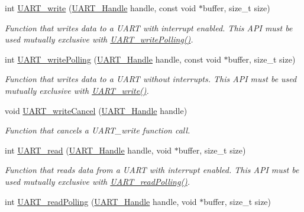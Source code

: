 \begin{DoxyCompactItemize}
int \hyperlink{_u_a_r_t_8h_a6f2a04c09dc17886e69e361cd80aaedc}{U\+A\+R\+T\+\_\+write} (\hyperlink{_u_a_r_t_8h_a13cc669fae768d8212e6491ce71b28af}{U\+A\+R\+T\+\_\+\+Handle} handle, const void $\ast$buffer, size\+\_\+t size)
\begin{DoxyCompactList}\small\item\em Function that writes data to a U\+A\+R\+T with interrupt enabled. This A\+P\+I must be used mutually exclusive with \hyperlink{_u_a_r_t_8h_aed09b432b5ebb7d88e78ccfe338e1bd4}{U\+A\+R\+T\+\_\+write\+Polling()}. \end{DoxyCompactList}\item 
int \hyperlink{_u_a_r_t_8h_aed09b432b5ebb7d88e78ccfe338e1bd4}{U\+A\+R\+T\+\_\+write\+Polling} (\hyperlink{_u_a_r_t_8h_a13cc669fae768d8212e6491ce71b28af}{U\+A\+R\+T\+\_\+\+Handle} handle, const void $\ast$buffer, size\+\_\+t size)
\begin{DoxyCompactList}\small\item\em Function that writes data to a U\+A\+R\+T without interrupts. This A\+P\+I must be used mutually exclusive with \hyperlink{_u_a_r_t_8h_a6f2a04c09dc17886e69e361cd80aaedc}{U\+A\+R\+T\+\_\+write()}. \end{DoxyCompactList}\item 
void \hyperlink{_u_a_r_t_8h_a0482cd0ab9ee7e802c8e785a5754d16d}{U\+A\+R\+T\+\_\+write\+Cancel} (\hyperlink{_u_a_r_t_8h_a13cc669fae768d8212e6491ce71b28af}{U\+A\+R\+T\+\_\+\+Handle} handle)
\begin{DoxyCompactList}\small\item\em Function that cancels a U\+A\+R\+T\+\_\+write function call. \end{DoxyCompactList}\item 
int \hyperlink{_u_a_r_t_8h_a023152d57539cad94bdd813956013e73}{U\+A\+R\+T\+\_\+read} (\hyperlink{_u_a_r_t_8h_a13cc669fae768d8212e6491ce71b28af}{U\+A\+R\+T\+\_\+\+Handle} handle, void $\ast$buffer, size\+\_\+t size)
\begin{DoxyCompactList}\small\item\em Function that reads data from a U\+A\+R\+T with interrupt enabled. This A\+P\+I must be used mutually exclusive with \hyperlink{_u_a_r_t_8h_aee4c56b20ea1c4c33406d99369db3df1}{U\+A\+R\+T\+\_\+read\+Polling()}. \end{DoxyCompactList}\item 
int \hyperlink{_u_a_r_t_8h_aee4c56b20ea1c4c33406d99369db3df1}{U\+A\+R\+T\+\_\+read\+Polling} (\hyperlink{_u_a_r_t_8h_a13cc669fae768d8212e6491ce71b28af}{U\+A\+R\+T\+\_\+\+Handle} handle, void $\ast$buffer, size\+\_\+t size)

\end{DoxyCompactItemize}
